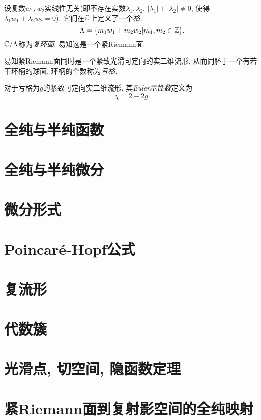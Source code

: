 \begin{example}
    设复数$w_1,w_2$实线性无关(即不存在实数$\lambda_1,\lambda_2$, $|\lambda_1|+|\lambda_2|\neq0$, 使得$\lambda_1w_1+\lambda_2w_2=0$). 它们在$\mathbb{C}$上定义了一个\textit{格}. 
    \[\Lambda=\{m_1w_1+m_2w_2|m_1,m_2\in\mathbb{Z}\}. \]
    $\mathbb{C}/\Lambda$称为\textit{复环面}. 易知这是一个紧Riemann面. 
\end{example}

易知紧Riemann面同时是一个紧致光滑可定向的实二维流形, 从而同胚于一个有若干环柄的球面, 环柄的个数称为\textit{亏格}. 
\begin{definition}
    对于亏格为$g$的紧致可定向实二维流形, 其\textit{Euler示性数}定义为
    \[\chi=2-2g. \]
\end{definition}
\section{全纯与半纯函数}\label{s1-3}

\section{全纯与半纯微分}\label{s1-4}

\section{微分形式}\label{s1-5}

\section{Poincar\texorpdfstring{\'e}{e}-Hopf公式}\label{s1-6}

\section{复流形}\label{s1-7}

\section{代数簇}\label{s1-8}

\section{光滑点, 切空间, 隐函数定理}\label{s1-9}

\section{紧Riemann面到复射影空间的全纯映射}\label{s1-15}
